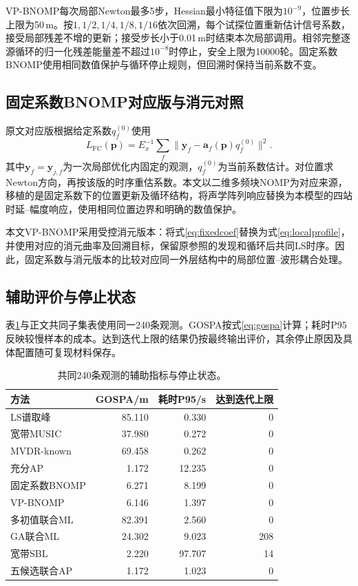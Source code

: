 \documentclass[a4paper,fleqn]{cas-sc}
\numberwithin{equation}{section}
\numberwithin{figure}{section}
\numberwithin{table}{section}
\begin{document}
VP-BNOMP每次局部Newton最多5步，Hessian最小特征值下限为$10^{-9}$，位置步长上限为50\,m。按$1,1/2,1/4,1/8,1/16$依次回溯，每个试探位置重新估计信号系数，接受局部残差不增的更新；接受步长小于0.01\,m时结束本次局部调用。相邻完整逐源循环的归一化残差能量差不超过$10^{-8}$时停止，安全上限为10000轮。固定系数BNOMP使用相同数值保护与循环停止规则，但回溯时保持当前系数不变。

\subsection{固定系数BNOMP对应版与消元对照}
原文对应版根据给定系数$q_f^{(0)}$使用
\begin{equation}
 L_{\mathrm{FC}}(\bm p)=E_x^{-1}\sum_f
 \|\bm y_f-\bm a_f(\bm p)q_f^{(0)}\|^2 .\label{eq:fixedcoef}
\end{equation}
其中$\bm y_f=\bm y_{j,f}$为一次局部优化内固定的观测，$q_f^{(0)}$为当前系数估计。对位置求Newton方向，再按该版的时序重估系数。本文以二维多频块NOMP\cite{Yang2022}为对应来源，移植的是固定系数下的位置更新及循环结构，将声学阵列响应替换为本模型的四站时延--幅度响应，使用相同位置边界和明确的数值保护。

本文VP-BNOMP采用受控消元版本：将式\eqref{eq:fixedcoef}替换为式\eqref{eq:localprofile}，并使用对应的消元曲率及回溯目标，保留原参照的发现和循环后共同LS时序。因此，固定系数与消元版本的比较对应同一外层结构中的局部位置--波形耦合处理。

\subsection{辅助评价与停止状态}
表\ref{tab:auxiliary}与正文共同子集表使用同一240条观测。GOSPA按式\eqref{eq:gospa}计算；耗时P95反映较慢样本的成本。达到迭代上限的结果仍按最终输出评价，其余停止原因及具体配置随可复现材料保存。

\begin{table}[pos=H]\centering\small
\caption{共同240条观测的辅助指标与停止状态。}\label{tab:auxiliary}
\begin{tabular}{@{}lrrr@{}}\toprule
方法 & GOSPA/m & 耗时P95/s & 达到迭代上限\\\midrule
LS谱取峰 & 85.110 & 0.330 & 0\\
宽带MUSIC & 37.980 & 0.272 & 0\\
MVDR-known & 69.458 & 0.262 & 0\\
充分AP & 1.172 & 12.235 & 0\\
固定系数BNOMP & 6.271 & 8.199 & 0\\
VP-BNOMP & 6.146 & 1.397 & 0\\
多初值联合ML & 82.391 & 2.560 & 0\\
GA联合ML & 24.302 & 9.023 & 208\\
宽带SBL & 2.220 & 97.707 & 14\\
五候选联合AP & 1.172 & 1.023 & 0\\
\bottomrule\end{tabular}\end{table}
\end{document}
